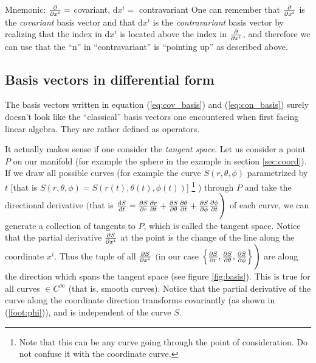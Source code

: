 \documentclass[a4paper, 12pt]{article}
\begin{document}
\vspace{0.5cm}
\begin{greenbox}{Mnemonic: $\frac{\partial {}}{\partial{x^i}} = $ covariant,  $\text{d}x^i = $ 
contravariant }
 One can remember that $\frac{\partial {}}{\partial{x^i}}$ is the \emph{covariant} basis vector 
and that $\text{d}x^i$ is the \emph{contravariant} basis vector by realizing 
that the index in $\text{d}x^i$ is located above the index in $\frac{\partial {}}{\partial{x^i}}$, 
and therefore we can use that the ``n'' in ``contravariant'' is ``pointing up'' 
as described above.
\end{greenbox}


\subsection{Basis vectors in differential form}\label{sec:bvdf}
The basis vectors written in equation (\ref{eq:cov_basis}) and 
(\ref{eq:con_basis}) surely doesn't look like the ``classical'' basis vectors 
one encountered when first facing linear algebra. They are rather defined as 
operators. 

It actually makes sense if one consider the \emph{tangent space}. Let us 
consider a point $P$ on our manifold (for example the sphere in the example in 
section \ref{sec:coord}). If we draw all possible curves (for example 
the curve $S(r,\theta,\phi)$ parametrized by $t$ [that is 
$S(r,\theta,\phi) = S(r(t),\theta(t),\phi(t))$]%
%
\footnote{\label{note:curve}Note that this can be any curve going through the 
          point of consideration. Do not confuse it with the coordinate curve.}%
%
) through $P$ and take the directional derivative $\Bigg($that is $\frac{\text{d}{S}}{\text{d}{t}} = 
\frac{\partial {S}}{\partial{r}}\frac{\partial {r}}{\partial{t}} + \frac{\partial {S}}{\partial{\theta}}\frac{\partial {\theta}}{\partial{t}} + 
\frac{\partial {S}}{\partial{\phi}}\frac{\partial {\phi}}{\partial{t}}\Bigg)$ of each curve, we can generate a 
collection of tangents to $P$, which is called the tangent space. Notice that 
the partial derivative $\frac{\partial {S}}{\partial{x^i}}$ at the point is the change of the line 
along the coordinate $x^i$. Thus the tuple of all $\frac{\partial {S}}{\partial{x^i}}$ $\Bigg($in 
our case $\left\{\frac{\partial {S}}{\partial{r}}, \frac{\partial {S}}{\partial{\theta}}, \frac{\partial {S}}{\partial{\phi}}\right\} \Bigg)$ are 
along the direction which spans the tangent space (see figure \ref{fig:basis}). 
This is true for all curves $\in C^{\infty}$ (that is, smooth curves). Notice 
that the partial derivative of the curve along the coordinate direction 
transforms covariantly (as shown in (\ref{foot:phi})), and is independent of the 
curve $S$.
\end{document}
